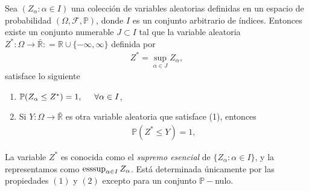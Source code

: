 \begin{theorem}
Sea $(Z_\alpha : \alpha \in I)$ una colección de variables aleatorias definidas en un espacio de probabilidad $(\Omega, \mathcal{F}, \mathbb{P})$, donde $I$ es un conjunto arbitrario de índices. Entonces existe un conjunto numerable $J \subset I$ tal que la variable aleatoria $Z^{*} : \Omega \rightarrow \bar{\mathbb{R}} : = \mathbb{R} \cup \{- \infty, \infty\}$ definida por
	\begin{align*}
	Z^{*} = \sup_{\alpha \in J} Z_\alpha,
	\end{align*}
satisface lo siguiente
	\begin{enumerate}
	\item $\mathbb{P}(Z_\alpha \leq Z^{*}) = 1, \hspace{0.5cm} \forall \alpha \in I$,
	\item Si $Y : \Omega \rightarrow \bar{\mathbb{R}}$ es otra variable aleatoria que satisface (1), entonces
	\begin{align*}
	\mathbb{P}(Z^{*} \leq Y) = 1,
	\end{align*}
	\end{enumerate}
\end{theorem}

La variable $Z^{*}$ es conocida como el \emph{supremo esencial} de $\{Z_\alpha : \alpha \in I\}$, y la representamos como $\operatorname*{esssup}_{\alpha \in I} Z_\alpha$. Está determinada únicamente por las propiedades $(1)$ y $(2)$ excepto para un conjunto $\mathbb{P}-$nulo.

